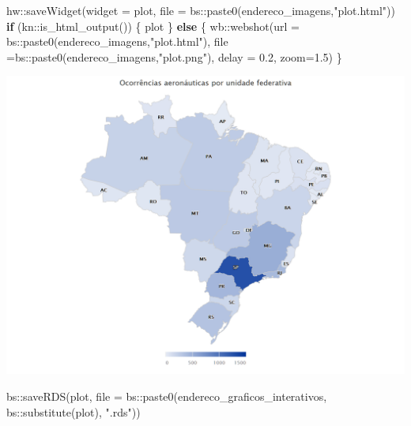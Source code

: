 \documentclass[
]{article}
\newenvironment{Shaded}{\begin{snugshade}}{\end{snugshade}}
\newcommand{\AttributeTok}[1]{\textcolor[rgb]{0.77,0.63,0.00}{#1}}
\newcommand{\ControlFlowTok}[1]{\textcolor[rgb]{0.13,0.29,0.53}{\textbf{#1}}}
\newcommand{\FloatTok}[1]{\textcolor[rgb]{0.00,0.00,0.81}{#1}}
\newcommand{\FunctionTok}[1]{\textcolor[rgb]{0.00,0.00,0.00}{#1}}
\newcommand{\NormalTok}[1]{#1}
\newcommand{\SpecialCharTok}[1]{\textcolor[rgb]{0.00,0.00,0.00}{#1}}
\newcommand{\StringTok}[1]{\textcolor[rgb]{0.31,0.60,0.02}{#1}}
\begin{document}
\begin{Shaded}
\begin{Highlighting}[]
\NormalTok{hw}\SpecialCharTok{::}\FunctionTok{saveWidget}\NormalTok{(}\AttributeTok{widget =}\NormalTok{ plot, }\AttributeTok{file =}\NormalTok{ bs}\SpecialCharTok{::}\FunctionTok{paste0}\NormalTok{(endereco\_imagens,}\StringTok{"plot.html"}\NormalTok{))}
\ControlFlowTok{if}\NormalTok{ (kn}\SpecialCharTok{::}\FunctionTok{is\_html\_output}\NormalTok{()) \{}
\NormalTok{    plot}
\NormalTok{\} }\ControlFlowTok{else}\NormalTok{ \{}
\NormalTok{    wb}\SpecialCharTok{::}\FunctionTok{webshot}\NormalTok{(}\AttributeTok{url =}\NormalTok{ bs}\SpecialCharTok{::}\FunctionTok{paste0}\NormalTok{(endereco\_imagens,}\StringTok{"plot.html"}\NormalTok{), }
                     \AttributeTok{file =}\NormalTok{bs}\SpecialCharTok{::}\FunctionTok{paste0}\NormalTok{(endereco\_imagens,}\StringTok{"plot.png"}\NormalTok{),}
                     \AttributeTok{delay =} \FloatTok{0.2}\NormalTok{,}
                     \AttributeTok{zoom=}\FloatTok{1.5}\NormalTok{)}
\NormalTok{\}}
\end{Highlighting}
\end{Shaded}

\begin{center}\includegraphics[width=1\linewidth]{../4.Relatorio/pdf/index_files/figure-latex/unnamed-chunk-30-1} \end{center}

\begin{Shaded}
\begin{Highlighting}[]
\NormalTok{bs}\SpecialCharTok{::}\FunctionTok{saveRDS}\NormalTok{(plot,}
           \AttributeTok{file =}\NormalTok{ bs}\SpecialCharTok{::}\FunctionTok{paste0}\NormalTok{(endereco\_graficos\_interativos,}
\NormalTok{                           bs}\SpecialCharTok{::}\FunctionTok{substitute}\NormalTok{(plot),}
                            \StringTok{".rds"}\NormalTok{))}
\end{Highlighting}
\end{Shaded}
\end{document}
